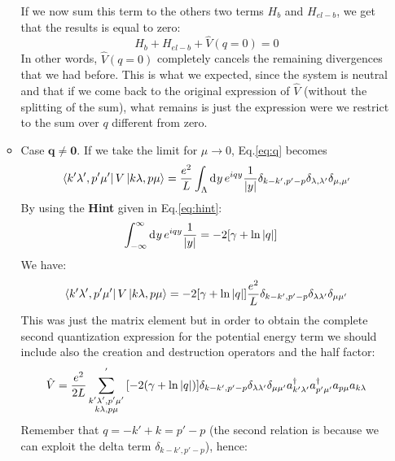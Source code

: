 \documentclass[11pt, a4paper, twoside, openright]{article}
\begin{document}
\begin{itemize}
\begin{itemize}
If we now sum this term to the others two terms \( H_b \) and \( H_{el-b} \), we get that the results is equal to zero:
\begin{equation*}
  H_b + H_{el-b} + \hat{V}  (q=0) = 0
\end{equation*}
In other words, \( \hat{V}  (q=0) \)  completely cancels the remaining divergences that we had before.
This is what we expected, since the system is neutral and that if we come back to the original expression of \( \hat{V}  \) (without the splitting of the sum), what remains is just the expression were we restrict to the sum over \( q \) different from zero.






\item Case \( \mathbf{q\neq0} \).
If we take the limit for \( \mu \rightarrow 0 \), Eq.\eqref{eq:q} becomes
\begin{equation*}
   \bra{k'\lambda', p' \mu'} V \ket{k \lambda , p \mu } = \frac{e^2}{L} \int_{\Lambda }^{} \dd[]{y} e^{i q y } \frac{1}{\abs{y} } \delta _{k-k',p'-p}  \delta _{\lambda , \lambda'} \delta _{\mu , \mu'}
\end{equation*}
By using the \textbf{Hint} given in Eq.\eqref{eq:hint}:
\begin{equation*}
\begin{split}
  \int_{-\infty }^{\infty} \dd[]{y} e^{i q y  } \frac{1}{\abs{y} } &
  =- 2 \qty[ \gamma + \ln{\abs{ q } }  ]
\end{split}
\end{equation*}
We have:
\begin{equation*}
  \bra{k'\lambda', p' \mu'} V \ket{k \lambda , p \mu } = - 2 \qty[ \gamma + \ln{\abs{q} }  ] \frac{e^2}{L} \delta _{k-k', p'-p} \delta _{\lambda \lambda'} \delta _{\mu \mu '}
\end{equation*}
This was just the matrix element but in order to obtain the complete second quantization expression for the potential energy term we should include also the creation and destruction operators and the half factor:
\begin{equation*}
  \hat{V} = \frac{e^2}{2L} \sum_{\substack{k' \lambda', p'\mu' \\ k\lambda , p \mu  } }^{'} \qty[ - 2 \qty( \gamma + \ln{\abs{q } }  ) ]
 \delta _{k-k', p'-p} \delta _{\lambda \lambda'} \delta _{\mu \mu'}
  a_{k'\lambda'} ^\dag a_{p'\mu'} ^\dag a_{p \mu} a_{k \lambda }
\end{equation*}
Remember that \( q = -k' + k = p' - p \) (the second relation is because we can exploit the delta term \(\delta _{k-k', p'-p}  \)), hence:

\end{itemize}
\end{itemize}
\end{document}
